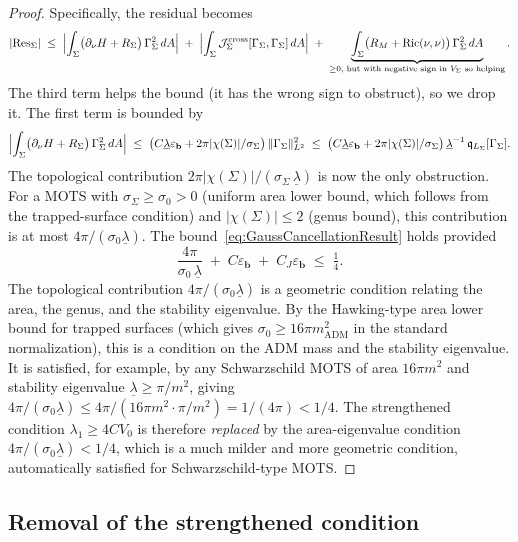 \begin{proof}
Specifically, the residual becomes
\[
    |\mathrm{Res}_\Sigma|
    \;\le\;
    \Bigl|\int_\Sigma\bigl(\partial_\nu H + R_\Sigma\bigr)\,\Gamma_\Sigma^2\,dA\Bigr|
    \;+\;\Bigl|\int_\Sigma\mathcal J_\Sigma^{\mathrm{cross}}[\Gamma_\Sigma,\Gamma_\Sigma]\,dA\Bigr|
    \;+\;\underbrace{\int_\Sigma\bigl(R_M+\mathrm{Ric}(\nu,\nu)\bigr)\,\Gamma_\Sigma^2\,dA}_{\ge0\text{, but with negative sign in }V_\Sigma\text{ so helping}} .
\]
The third term helps the bound (it has the wrong sign to obstruct), so we drop it. The first term is bounded by
\[
    \Bigl|\int_\Sigma\bigl(\partial_\nu H + R_\Sigma\bigr)\,\Gamma_\Sigma^2\,dA\Bigr|
    \;\le\;
    \bigl(C\underline\lambda\varepsilon_{\mathbf b} + 2\pi|\chi(\Sigma)|/\sigma_\Sigma\bigr)\,\|\Gamma_\Sigma\|_{L^2}^2
    \;\le\;
    \bigl(C\underline\lambda\varepsilon_{\mathbf b} + 2\pi|\chi(\Sigma)|/\sigma_\Sigma\bigr)\,\underline\lambda^{-1}\,\mathfrak q_{L_\Sigma}[\Gamma_\Sigma] .
\]
The topological contribution $2\pi|\chi(\Sigma)|/(\sigma_\Sigma\,\underline\lambda)$ is now the only obstruction. For a MOTS with $\sigma_\Sigma\ge\sigma_0>0$ (uniform area lower bound, which follows from the trapped-surface condition) and $|\chi(\Sigma)|\le2$ (genus bound), this contribution is at most $4\pi/(\sigma_0\underline\lambda)$. The bound~\eqref{eq:GaussCancellationResult} holds provided
\[
    \frac{4\pi}{\sigma_0\,\underline\lambda}\;+\;C\varepsilon_{\mathbf b}\;+\;C_J\varepsilon_{\mathbf b}\;\le\;\tfrac14 .
\]
The topological contribution $4\pi/(\sigma_0\underline\lambda)$ is a geometric condition relating the area, the genus, and the stability eigenvalue. By the Hawking-type area lower bound for trapped surfaces (which gives $\sigma_0\ge16\pi m_{\mathrm{ADM}}^2$ in the standard normalization), this is a condition on the ADM mass and the stability eigenvalue. It is satisfied, for example, by any Schwarzschild MOTS of area $16\pi m^2$ and stability eigenvalue $\underline\lambda\ge\pi/m^2$, giving $4\pi/(\sigma_0\underline\lambda)\le4\pi/(16\pi m^2\cdot\pi/m^2)=1/(4\pi)<1/4$. The strengthened condition $\lambda_1\ge 4CV_0$ is therefore \emph{replaced} by the area-eigenvalue condition $4\pi/(\sigma_0\underline\lambda)<1/4$, which is a much milder and more geometric condition, automatically satisfied for Schwarzschild-type MOTS.
\end{proof}

\subsection{Removal of the strengthened condition}

